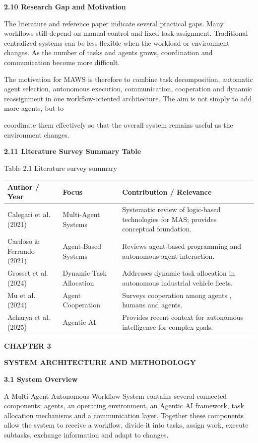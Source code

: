 \documentclass[12pt,letterpaper]{article}
\newcommand{\chaptertitle}[2]{%
  \begin{center}
    {\fontsize{15pt}{18pt}\selectfont\bfseries #1\par}%
    \vspace{2pt}%
    {\fontsize{15pt}{18pt}\selectfont\bfseries #2\par}%
  \end{center}%
  \vspace{10pt}%
}
\newcommand{\sectiontitle}[1]{%
  \vspace{6pt}%
  {\noindent\fontsize{13.2pt}{16pt}\selectfont\bfseries #1\par}%
  \vspace{2pt}%
}
\newcommand{\tablecaption}[1]{%
  \begin{center}
    {\fontsize{10.4pt}{12pt}\selectfont #1\par}%
  \end{center}%
  \vspace{2pt}%
}
\newcommand{\bodytextstyle}{\fontsize{11.3pt}{25.8pt}\selectfont}
\begin{document}
\sectiontitle{2.10 Research Gap and Motivation}
The literature and reference paper indicate several practical gaps. Many workflows still depend on manual control and fixed task assignment. Traditional centralized systems can be less flexible when the workload or environment changes. As the number of tasks and agents grows, coordination and communication become more difficult.

The motivation for MAWS is therefore to combine task decomposition, automatic agent selection, autonomous execution, communication, cooperation and dynamic reassignment in one workflow-oriented architecture. The aim is not simply to add more agents, but to
\newpage

coordinate them effectively so that the overall system remains useful as the environment changes.

\sectiontitle{2.11 Literature Survey Summary Table}
\tablecaption{Table 2.1 Literature survey summary}

\fontsize{8pt}{10.5pt}\selectfont
\noindent\begin{tabularx}{\linewidth}{|>{\centering\arraybackslash}p{3.2cm}|>{\centering\arraybackslash}p{3.5cm}|>{\arraybackslash}X|}
\hline
\rowcolor{tableheader}
\textbf{Author / Year} & \textbf{Focus} & \textbf{Contribution / Relevance} \\
\hline
Calegari et al. (2021) & Multi-Agent Systems & Systematic review of logic-based technologies for MAS; provides conceptual foundation. \\
\hline
Cardoso \& Ferrando (2021) & Agent-Based Systems & Reviews agent-based programming and autonomous agent interaction. \\
\hline
Grosset et al. (2024) & Dynamic Task Allocation & Addresses dynamic task allocation in autonomous industrial vehicle fleets. \\
\hline
Mu et al. (2024) & Agent Cooperation & Surveys cooperation among agents , humans and agents. \\
\hline
Acharya et al. (2025) & Agentic AI & Provides recent context for autonomous intelligence for complex goals. \\
\hline
\end{tabularx}
\newpage

\bodytextstyle
\chaptertitle{CHAPTER 3}{SYSTEM ARCHITECTURE AND METHODOLOGY}

\sectiontitle{3.1 System Overview}
A Multi-Agent Autonomous Workflow System contains several connected components: agents, an operating environment, an Agentic AI framework, task allocation mechanisms and a communication layer. Together these components allow the system to receive a workflow, divide it into tasks, assign work, execute subtasks, exchange information and adapt to changes.
\end{document}
